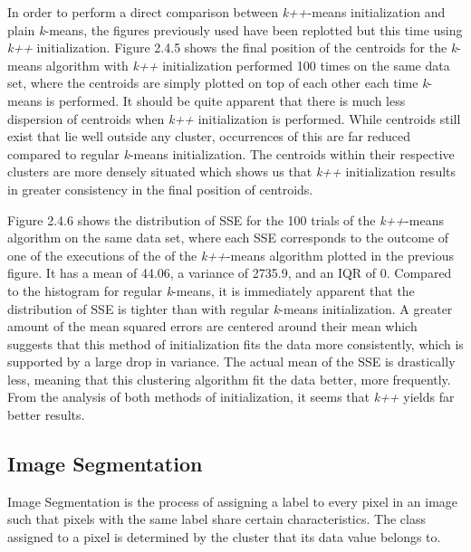 \documentclass[12pt]{article}
\begin{document}
\pagebreak

  \par In order to perform a direct comparison between \textit{k++}-means initialization and plain \textit{k}-means, the figures previously used have been replotted but this time using \textit{k++} initialization. Figure 2.4.5 shows the final position of the centroids for the \textit{k}-means algorithm with \textit{k++} initialization performed 100 times on the same data set, where the centroids are simply plotted on top of each other each time \textit{k}-means is performed. It should be quite apparent that there is much less dispersion of centroids when \textit{k++} initialization is performed. While centroids still exist that lie well outside any cluster, occurrences of this are far reduced compared to regular \textit{k}-means initialization. The centroids within their respective clusters are more densely situated which shows us that \textit{k++} initialization results in greater consistency in the final position of centroids.

  \par Figure 2.4.6 shows the distribution of SSE for the 100 trials of the \textit{k++}-means algorithm on the same data set, where each SSE corresponds to the outcome of one of the executions of the of the \textit{k++}-means algorithm plotted in the previous figure. It has a mean of 44.06, a variance of 2735.9, and an IQR of 0. Compared to the histogram for regular \textit{k}-means, it is immediately apparent that the distribution of SSE is tighter than with regular \textit{k}-means initialization. A greater amount of the mean squared errors are centered around their mean which suggests that this method of initialization fits the data more consistently, which is supported by a large drop in variance. The actual mean of the SSE is drastically less, meaning that this clustering algorithm fit the data better, more frequently. From the analysis of both methods of initialization, it seems that \textit{k++} yields far better results.

\subsection {Image Segmentation}
  \par Image Segmentation is the process of assigning a label to every pixel in an image such that pixels with the same label share certain characteristics. \cite{is_1} The class assigned to a pixel is determined by the cluster that its data value belongs to.
\end{document}
